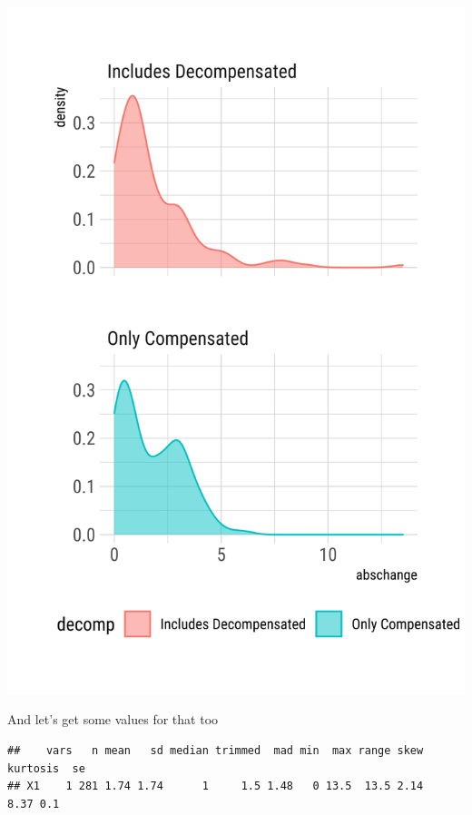 \documentclass[
]{article}
\newenvironment{Shaded}{\begin{snugshade}}{\end{snugshade}}
\newcommand{\FunctionTok}[1]{\textcolor[rgb]{0.00,0.00,0.00}{#1}}
\newcommand{\NormalTok}[1]{#1}
\newcommand{\SpecialCharTok}[1]{\textcolor[rgb]{0.00,0.00,0.00}{#1}}
\begin{document}
\includegraphics{figures/unnamed-chunk-26-1.png}

And let's get some values for that too

\begin{Shaded}
\end{Shaded}

\begin{verbatim}
##    vars   n mean   sd median trimmed  mad min  max range skew kurtosis  se
## X1    1 281 1.74 1.74      1     1.5 1.48   0 13.5  13.5 2.14     8.37 0.1
\end{verbatim}
\end{document}
